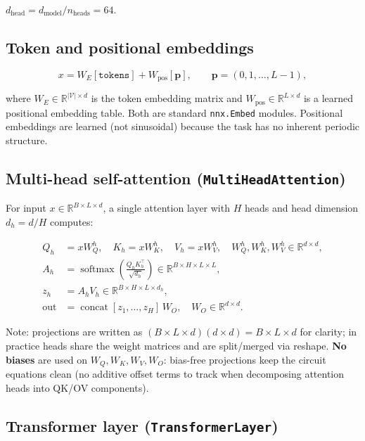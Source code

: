 \documentclass[11pt, a4paper]{article}
\DeclareMathOperator{\softmax}{softmax}
\begin{document}
$d_{\text{head}} = d_{\text{model}} / n_{\text{heads}} = 64$.

\subsection{Token and positional embeddings}

\[
  x = W_E[\texttt{tokens}] + W_{\text{pos}}[\mathbf{p}],
  \qquad
  \mathbf{p} = (0, 1, \ldots, L-1),
\]

where $W_E \in \mathbb{R}^{|\mathcal{V}| \times d}$ is the token embedding
matrix and $W_{\text{pos}} \in \mathbb{R}^{L \times d}$ is a learned
positional embedding table. Both are standard \texttt{nnx.Embed} modules.
Positional embeddings are learned (not sinusoidal) because the task has no
inherent periodic structure.

\subsection{Multi-head self-attention (\texttt{MultiHeadAttention})}

For input $x \in \mathbb{R}^{B \times L \times d}$, a single attention layer
with $H$ heads and head dimension $d_h = d / H$ computes:

\begin{align}
  Q_h &= x W_Q^h, \quad K_h = x W_K^h, \quad V_h = x W_V^h,
  \quad W_Q^h, W_K^h, W_V^h \in \mathbb{R}^{d \times d}, \\[4pt]
  A_h &= \softmax\!\left(\frac{Q_h K_h^\top}{\sqrt{d_h}}\right) \in \mathbb{R}^{B \times H \times L \times L}, \\[4pt]
  z_h &= A_h V_h \in \mathbb{R}^{B \times H \times L \times d_h}, \\[4pt]
  \text{out} &= \operatorname{concat}[z_1, \ldots, z_H] \, W_O,
  \quad W_O \in \mathbb{R}^{d \times d}.
\end{align}

Note: projections are written as $(B \times L \times d)(d \times d) = B \times L \times d$ for clarity; in practice heads share the weight matrices and are split/merged via reshape. \textbf{No biases} are used on $W_Q, W_K, W_V, W_O$: bias-free projections keep the circuit equations clean (no additive offset terms to track when decomposing attention heads into QK/OV components).

\subsection{Transformer layer (\texttt{TransformerLayer})}
\end{document}
